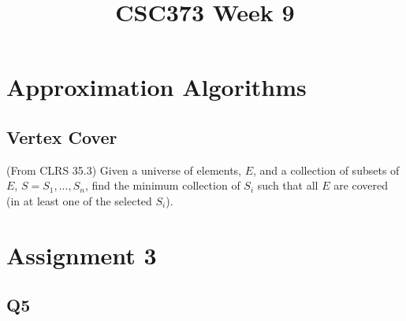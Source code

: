 \documentclass[]{article}
\title{CSC373 Week 9}
\date{}
\begin{document}
\maketitle
\section{Approximation Algorithms}
\subsection{Vertex Cover}
(From CLRS 35.3)
Given a universe of elements, $E$, and a collection of subsets of $E$, $S=S_1, ..., S_n$, find the minimum collection of $S_i$ such that all $E$ are covered (in at least one of the selected $S_i$).
\section{Assignment 3}
\subsection*{Q5}
\end{document}

